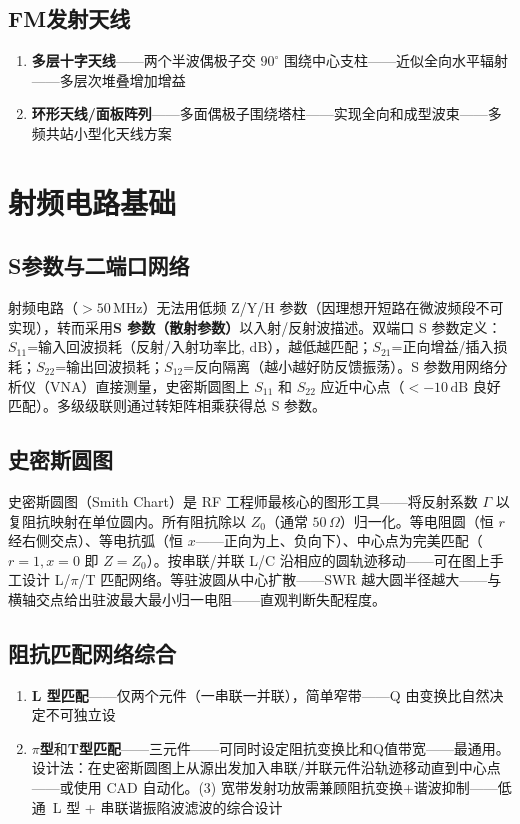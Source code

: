 \documentclass[12pt,UTF8]{ctexbook}
\begin{document}
\subsection{FM发射天线}


\begin{enumerate}
\item \textbf{多层十字天线}——两个半波偶极子交 $90^\circ$ 围绕中心支柱——近似全向水平辐射——多层次堆叠增加增益
\item \textbf{环形天线/面板阵列}——多面偶极子围绕塔柱——实现全向和成型波束——多频共站小型化天线方案
\end{enumerate}

\section{射频电路基础}
\label{sec:rf_circuit_basics}

\subsection{S参数与二端口网络}

射频电路（$>50\,\mathrm{MHz}$）无法用低频 Z/Y/H 参数（因理想开短路在微波频段不可实现），转而采用\textbf{S 参数（散射参数）}以入射/反射波描述。双端口 S 参数定义：$S_{11}$=输入回波损耗（反射/入射功率比, dB），越低越匹配；$S_{21}$=正向增益/插入损耗；$S_{22}$=输出回波损耗；$S_{12}$=反向隔离（越小越好防反馈振荡）。S 参数用网络分析仪（VNA）直接测量，史密斯圆图上 $S_{11}$ 和 $S_{22}$ 应近中心点（$<-10\,\mathrm{dB}$ 良好匹配）。多级级联则通过转矩阵相乘获得总 S 参数。

\subsection{史密斯圆图}

史密斯圆图（Smith Chart）是 RF 工程师最核心的图形工具——将反射系数 $\Gamma$ 以复阻抗映射在单位圆内。所有阻抗除以 $Z_0$（通常 $50\,\Omega$）归一化。等电阻圆（恒 $r$ 经右侧交点）、等电抗弧（恒 $x$——正向为上、负向下）、中心点为完美匹配（$r=1,x=0$ 即 $Z=Z_0$）。按串联/并联 L/C 沿相应的圆轨迹移动——可在图上手工设计 L/$\pi$/T 匹配网络。等驻波圆从中心扩散——SWR 越大圆半径越大——与横轴交点给出驻波最大最小归一电阻——直观判断失配程度。

\subsection{阻抗匹配网络综合}


\begin{enumerate}
\item \textbf{L 型匹配}——仅两个元件（一串联一并联），简单窄带——Q 由变换比自然决定不可独立设
\item \textbf{$\pi$型}和\textbf{T型匹配}——三元件——可同时设定阻抗变换比和Q值带宽——最通用。设计法：在史密斯圆图上从源出发加入串联/并联元件沿轨迹移动直到中心点——或使用 CAD 自动化。(3) 宽带发射功放需兼顾阻抗变换+谐波抑制——低通\ L 型 + 串联谐振陷波滤波的综合设计
\end{enumerate}
\end{document}
